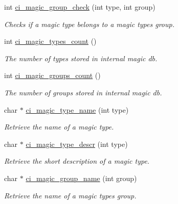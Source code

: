 \begin{DoxyCompactItemize}
int \hyperlink{group__DATATYPE_ga7982eeaaf7bec51490a0409382db447a}{ci\_\-magic\_\-group\_\-check} (int type, int group)
\begin{DoxyCompactList}\small\item\em Checks if a magic type belongs to a magic types group. \item\end{DoxyCompactList}\item 
int \hyperlink{group__DATATYPE_ga4b6d1fb7ebd31e751d2bae64e7ee042b}{ci\_\-magic\_\-types\_\-count} ()
\begin{DoxyCompactList}\small\item\em The number of types stored in internal magic db. \item\end{DoxyCompactList}\item 
int \hyperlink{group__DATATYPE_gabf2d67fabccd0c3776d628345413d5ae}{ci\_\-magic\_\-groups\_\-count} ()
\begin{DoxyCompactList}\small\item\em The number of groups stored in internal magic db. \item\end{DoxyCompactList}\item 
char $\ast$ \hyperlink{group__DATATYPE_ga2d765f13e58b595e7a95ec025118af8b}{ci\_\-magic\_\-type\_\-name} (int type)
\begin{DoxyCompactList}\small\item\em Retrieve the name of a magic type. \item\end{DoxyCompactList}\item 
char $\ast$ \hyperlink{group__DATATYPE_gaea712bbaee4aff2770275cd61a9bf92b}{ci\_\-magic\_\-type\_\-descr} (int type)
\begin{DoxyCompactList}\small\item\em Retrieve the short description of a magic type. \item\end{DoxyCompactList}\item 
char $\ast$ \hyperlink{group__DATATYPE_ga0862bc88a22fcb42f18b2a48bf56ddd0}{ci\_\-magic\_\-group\_\-name} (int group)
\begin{DoxyCompactList}\small\item\em Retrieve the name of a magic types group. \item\end{DoxyCompactList}\end{DoxyCompactItemize}


